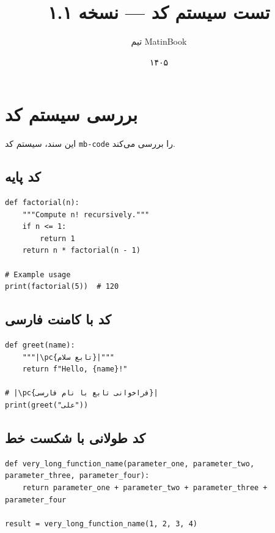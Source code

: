 \documentclass{matinbook}
\title{تست سیستم کد — نسخه ۱.۱}
\author{تیم MatinBook}
\date{۱۴۰۵}
\begin{document}
\maketitle

\chapter{بررسی سیستم کد}
\label{chap:test-code}

این سند، سیستم کد \texttt{mb-code} را بررسی می‌کند.

\section{کد پایه}
\label{sec:basic-code}

\begin{latin}
\begin{verbatim}
def factorial(n):
    """Compute n! recursively."""
    if n <= 1:
        return 1
    return n * factorial(n - 1)

# Example usage
print(factorial(5))  # 120
\end{verbatim}
\end{latin}

\section{کد با کامنت فارسی}
\label{sec:persian-comment}

\begin{latin}
\begin{verbatim}
def greet(name):
    """|\pc{تابع سلام}|"""
    return f"Hello, {name}!"

# |\pc{فراخوانی تابع با نام فارسی}|
print(greet("علی"))
\end{verbatim}
\end{latin}

\section{کد طولانی با شکست خط}
\label{sec:long-code}

\begin{latin}
\begin{verbatim}
def very_long_function_name(parameter_one, parameter_two, parameter_three, parameter_four):
    return parameter_one + parameter_two + parameter_three + parameter_four

result = very_long_function_name(1, 2, 3, 4)
\end{verbatim}
\end{latin}
\end{document}
